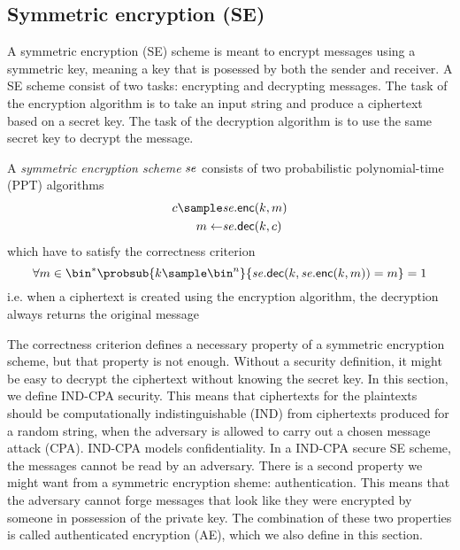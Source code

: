 \newpage
\subsection{Symmetric encryption (SE)}\label{ssec:enc-definition}
A symmetric encryption (SE) scheme is meant to encrypt messages using a symmetric key, meaning a key that is posessed by both the sender and receiver. A SE scheme consist of two tasks: encrypting and decrypting messages. The task of the encryption algorithm is to take an input string and produce a ciphertext based on a secret key. The task of the decryption algorithm is to use the same secret key to decrypt the message.

\begin{syntax}
	A \emph{symmetric encryption scheme} $\mathit{{se}}$ consists of two probabilistic polynomial-time (PPT) algorithms
	\begin{align*}
		c \sample & \se.\enc(k,m) \\
		m\gets    & \se.\dec(k,c)
	\end{align*}
	which have to satisfy the correctness criterion
	\[\forall m\in\bin^* \probsub{k\sample\bin^n}{\se.\dec(k,\se.\enc(k,m))=m}=1\]
	i.e. when a ciphertext is created using the encryption algorithm, the decryption always returns the original message
\end{syntax}

\begin{remark}
	The correctness criterion defines a necessary property of a symmetric encryption scheme, but that property is not enough. Without a security definition, it might be easy to decrypt the ciphertext without knowing the secret key. In this section, we define IND-CPA security. This means that ciphertexts for the plaintexts should be computationally indistinguishable (IND) from ciphertexts produced for a random string, when the adversary is allowed to carry out a chosen message attack (CPA). IND-CPA models confidentiality. In a IND-CPA secure SE scheme, the messages cannot be read by an adversary. There is a second property we might want from a symmetric encryption sheme: authentication. This means that the adversary cannot forge messages that look like they were encrypted by someone in possession of the private key. The combination of these two properties is called authenticated encryption (AE), which we also define in this section.
\end{remark}

